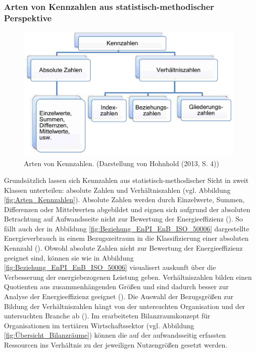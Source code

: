 \subsubsection{Arten von Kennzahlen aus statistisch-methodischer Perspektive}

\begin{figure}[H]
    \centering
    \includegraphics[width=1\textwidth]{../../Ressourcen/Abbildungen/Arten_Kennzahlen_Hohnhold.jpg}
    \caption{Arten von Kennzahlen. (Darstellung von Hohnhold (2013, S. 4))}
    \label{fig:Arten_Kennzahlen}
\end{figure}

Grundsätzlich lassen sich Kennzahlen aus statistisch-methodischer Sicht in zweit Klassen unterteilen: absolute Zahlen und Verhältniszahlen (vgl. Abbildung \eqref{fig:Arten_Kennzahlen}).
Absolute Zahlen werden durch Einzelwerte, Summen, Differenzen oder Mittelwerten abgebildet und eignen sich aufgrund der absoluten Betrachtung auf Aufwandsseite nicht zur Bewertung der Energieeffizienz (\cite[S. 2]{Hohnhold.2013}).
So fällt auch der in Abbildung \eqref{fig:Beziehung_EnPI_EnB_ISO_50006} dargestellte Energieverbrauch in einem Bezugszeitraum in die Klassifizierung einer absoluten Kennzahl (\cite[S. 2]{Hohnhold.2013}).
Obwohl absolute Zahlen nicht zur Bewertung der Energieeffizienz geeignet sind, können sie wie in Abbildung \eqref{fig:Beziehung_EnPI_EnB_ISO_50006} visualisert 
auskunft über die Verbesserung der energiebezogenen Leistung geben.
Verhältniszahlen bilden einen Quotienten aus zusammenhängenden Größen und sind dadurch besser zur Analyse der Energieeffizienz geeignet (\cite[S. 3]{Hohnhold.2013}).
Die Auswahl der Bezugsgrößen zur Bildung der Verhältniszahlen hängt von der untersuchten Organisation und der untersuchten Branche ab (\cite[S. 3]{Hohnhold.2013}). 
Im erarbeiteten Bilanzraumkonzept für Organisationen im tertiären Wirtschaftssektor (vgl. Abbildung \eqref{fig:Übersicht_Bilanzräume}) können die auf der aufwandsseitig erfassten Ressourcen ins 
Verhältnis zu der jeweiligen Nutzengrößen gesetzt werden.

